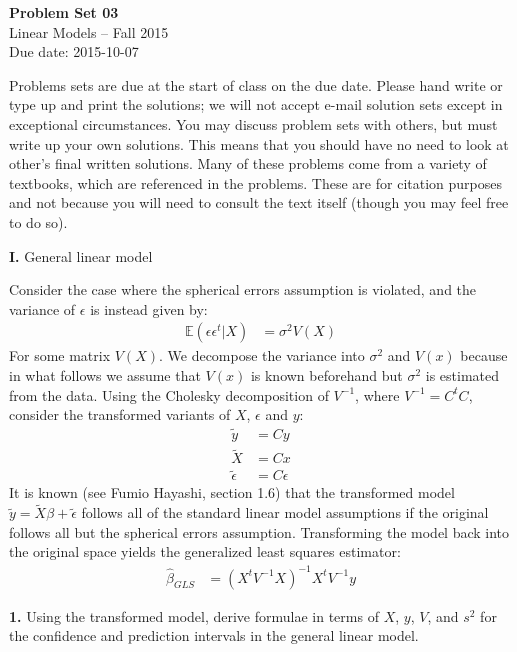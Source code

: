 \documentclass[12pt]{article}
\begin{document}
\begin{center}
{\bf Problem Set 03} \\
Linear Models -- Fall 2015 \\
Due date: 2015-10-07
\end{center}

\medskip

Problems sets are due at the start of class on the due date. Please hand write
or type up and print the solutions; we will not accept e-mail solution sets except
in exceptional circumstances. You may discuss problem sets with others, but must
write up your own solutions. This means that you should have no need to look at other's
final written solutions. Many of these problems come from a variety of textbooks,
which are referenced in the problems. These are for citation purposes and not because
you will need to consult the text itself (though you may feel free to do so).

\medskip

{\bf I.} General linear model

Consider the case where the spherical errors assumption is violated, and
the variance of $\epsilon$ is instead given by:
\begin{align}
\mathbb{E} (\epsilon \epsilon^t | X) &= \sigma^2 V(X) \label{gerr}
\end{align}
For some matrix $V(X)$. We decompose the variance into $\sigma^2$ and $V(x)$ because
in what follows we assume that $V(x)$ is known beforehand but $\sigma^2$ is estimated
from the data. Using the Cholesky decomposition of 
$V^{-1}$, where $V^{-1} = C^t C$, consider the transformed variants of $X$, $\epsilon$ and $y$:
\begin{align}
\tilde{y} &= Cy \\
\tilde{X} &= Cx \\
\tilde{\epsilon} &= C\epsilon
\end{align}
It is known (see Fumio Hayashi, section 1.6) that the transformed model
$\tilde{y} = \tilde{X}\beta + \tilde{\epsilon}$ follows all of the standard
linear model assumptions if the original follows all but the spherical errors
assumption. Transforming the model back into the original space yields the
generalized least squares estimator:
\begin{align}
\widehat{\beta}_{GLS} &= (X^t V^{-1} X)^{-1} X^t V^{-1} y
\end{align}

{\bf 1.} Using the transformed model, derive formulae in terms of $X$, $y$, $V$, and
$s^2$ for the confidence and prediction intervals in the general linear model.
\end{document}
